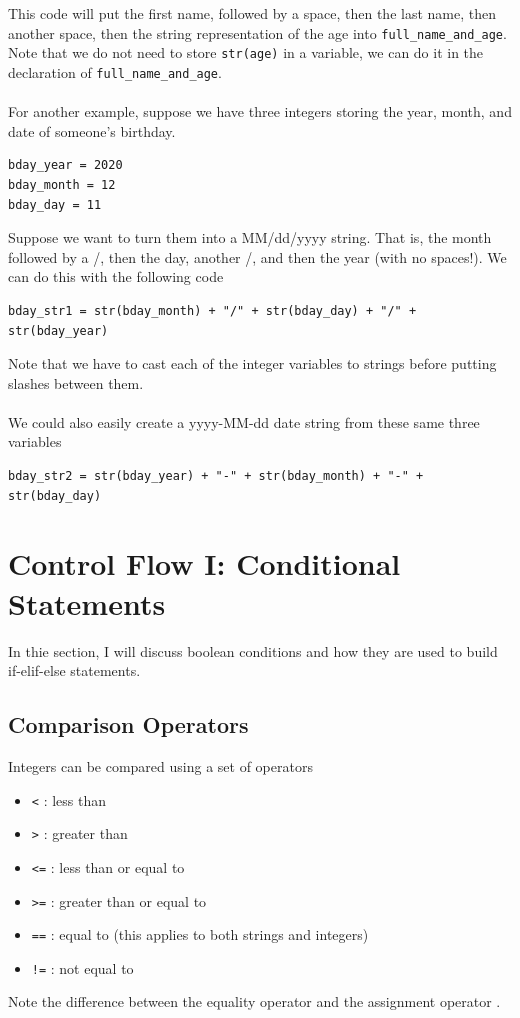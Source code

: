 \documentclass{article}
\begin{document}
This code will put the first name, followed by a space, then the last name, then another space, then the string representation of the age into \texttt{full\_name\_and\_age}. Note that we do not need to store \texttt{str(age)} in a variable, we can do it in the declaration of \texttt{full\_name\_and\_age}.\\\\
For another example, suppose we have three integers storing the year, month, and date of someone's birthday.
\begin{verbatim}
bday_year = 2020
bday_month = 12
bday_day = 11
\end{verbatim}
Suppose we want to turn them into a MM/dd/yyyy string. That is, the month followed by a /, then the day, another /, and then the year (with no spaces!). We can do this with the following code
\begin{verbatim}
bday_str1 = str(bday_month) + "/" + str(bday_day) + "/" + str(bday_year)
\end{verbatim}
Note that we have to cast each of the integer variables to strings before putting slashes between them.\\\\
We could also easily create a yyyy-MM-dd date string from these same three variables
\begin{verbatim}
bday_str2 = str(bday_year) + "-" + str(bday_month) + "-" + str(bday_day)
\end{verbatim}

\section{Control Flow I: Conditional Statements}
In thie section, I will discuss boolean conditions and how they are used to build if-elif-else statements.

\subsection{Comparison Operators}
Integers can be compared using a set of operators
\begin{itemize}
    \item \texttt{<} : less than
    \item \texttt{>} : greater than
    \item \texttt{<=} : less than or equal to
    \item \texttt{>=} : greater than or equal to
    \item \texttt{==} : equal to (this applies to both strings and integers)
    \item \texttt{!=} : not equal to
\end{itemize}
Note the difference between the equality operator \text{==} and the assignment operator \text{=}.
\end{document}
